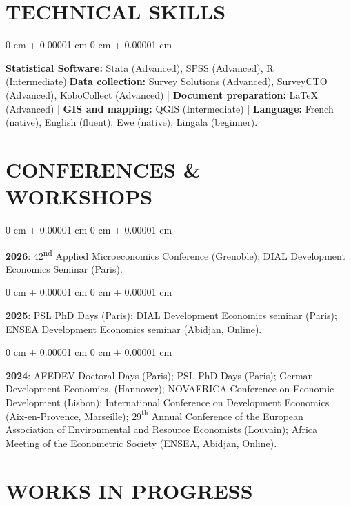 \documentclass[10 pt, letterpaper]{article}
\newenvironment{onecolentry}{
    \begin{adjustwidth}{
        0 cm + 0.00001 cm
    }{
        0 cm + 0.00001 cm
    }
}{
    \end{adjustwidth}
} %
\begin{document}
    
    \section{TECHNICAL SKILLS}
        
        \begin{onecolentry}
            \textbf{Statistical Software:} Stata (Advanced), SPSS (Advanced), R (Intermediate)|\textbf{Data collection:} Survey Solutions (Advanced), SurveyCTO (Advanced), KoboCollect (Advanced) | \textbf{Document preparation:} LaTeX (Advanced) | \textbf{GIS and mapping:} QGIS (Intermediate) | \textbf{Language:} French (native), English (fluent), Ewe (native), Lingala (beginner).
        \end{onecolentry}
            
    \section{CONFERENCES \& WORKSHOPS}

        \begin{onecolentry}
            \textbf{2026}: 42\textsuperscript{nd} Applied Microeconomics Conference (Grenoble); DIAL Development Economics Seminar (Paris).
        \end{onecolentry}
        \vspace{0.20 cm}

        \begin{onecolentry}
            \textbf{2025}: PSL PhD Days (Paris); DIAL Development Economics seminar (Paris); ENSEA Development Economics seminar (Abidjan, Online).
        \end{onecolentry}
        \vspace{0.20 cm}
        
        \begin{onecolentry}
            \textbf{2024}: AFEDEV Doctoral Days (Paris); PSL PhD Days (Paris); German Development Economics, (Hannover); NOVAFRICA Conference on Economic Development (Lisbon); International Conference on Development Economics (Aix-en-Provence, Marseille); $29^{\text{th}}$ Annual Conference of the European Association of Environmental and Resource Economists (Louvain); Africa Meeting of the Econometric Society (ENSEA, Abidjan, Online).
        \end{onecolentry}
    
    \section{WORKS IN PROGRESS}
\end{document}
